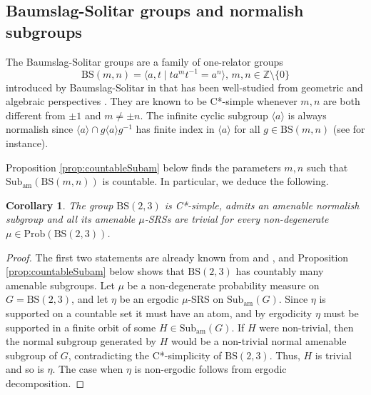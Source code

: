 \documentclass[reqno,a4paper,11pt]{amsart}
\numberwithin{equation}{section}
\newcommand{\1}{\mathbf{1}}
\def\Z{{\mathbb Z}}
\newcommand{\subam}[1]{\mathrm{Sub}_{\mathrm{am}}(#1)}
\newtheorem{cor}[teo]{Corollary}
\theoremstyle{definition}
\begin{document}
\subsection{Baumslag-Solitar groups and normalish subgroups}
The Baumslag-Solitar groups are a family of one-relator groups
\[
\mathrm{BS}(m,n) = \langle a,t \mid ta^mt^{-1} = a^n\rangle,\, m,n \in \Z \setminus \{0\}
\]
introduced by Baumslag-Solitar in \cite{BaumslagSolitar1962} that has been well-studied from geometric and algebraic perspectives \cite{Whyte2001, levittAutomorphisms}. They are known to be C*-simple \cite[Proposition 5]{deLaHarpePreaux2011} whenever $m,n$ are both different from $\pm 1$ and $m \neq \pm n$. The infinite cyclic subgroup $\langle a \rangle$ is always normalish since $\langle a \rangle \cap g \langle a \rangle g^{-1}$ has finite index in $\langle a \rangle$ for all $g \in \mathrm{BS}(m,n)$ (see \cite[Section 2]{levittAutomorphisms} for instance).

Proposition \ref{prop:countableSubam} below finds the parameters $m,n$ such that $\mathrm{Sub}_\mathrm{am}(\mathrm{BS}(m,n))$ is countable. In particular, we deduce the following.

\begin{cor} \label{cor:noSRSs}
	The group $\mathrm{BS}(2,3)$ is C*-simple, admits an amenable normalish subgroup and all its amenable $\mu$-SRSs are trivial for every non-degenerate $\mu \in \mathrm{Prob}(\mathrm{BS}(2,3))$.
\end{cor}
\begin{proof}
	The first two statements are already known from \cite[Proposition 5]{deLaHarpePreaux2011} and \cite[Section 2]{levittAutomorphisms}, and Proposition \ref{prop:countableSubam} below shows that $\mathrm{BS}(2,3)$ has countably many amenable subgroups. Let $\mu$ be a non-degenerate probability measure on $G = \mathrm{BS}(2,3)$, and let $\eta$ be an ergodic $\mu$-SRS on $\subam{G}$. Since $\eta$ is supported on a countable set it must have an atom, and by ergodicity $\eta$ must be supported in a finite orbit of some $H \in \subam{G}$. If $H$ were non-trivial, then the normal subgroup generated by $H$ would be a non-trivial normal amenable subgroup of $G$, contradicting the C*-simplicity of $\mathrm{BS}(2,3)$. Thus, $H$ is trivial and so is $\eta$. The case when $\eta$ is non-ergodic follows from ergodic decomposition.
\end{proof}
\end{document}
